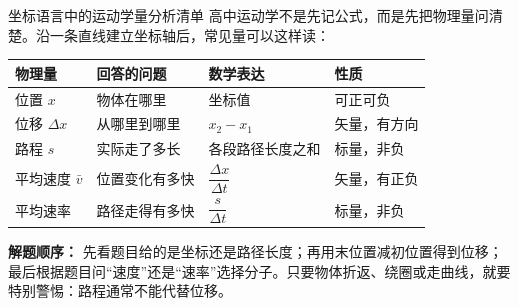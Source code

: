 \begin{learningbox}{坐标语言中的运动学量分析清单}
高中运动学不是先记公式，而是先把物理量问清楚。沿一条直线建立坐标轴后，常见量可以这样读：

\begin{center}
\begin{tabular}{llll}
\toprule
物理量 & 回答的问题 & 数学表达 & 性质 \\
\midrule
位置 $x$ & 物体在哪里 & 坐标值 & 可正可负 \\
位移 $\Delta x$ & 从哪里到哪里 & $x_2-x_1$ & 矢量，有方向 \\
路程 $s$ & 实际走了多长 & 各段路径长度之和 & 标量，非负 \\
平均速度 $\bar v$ & 位置变化有多快 & $\dfrac{\Delta x}{\Delta t}$ & 矢量，有正负 \\
平均速率 & 路径走得有多快 & $\dfrac{s}{\Delta t}$ & 标量，非负 \\
\bottomrule
\end{tabular}
\end{center}

\textbf{解题顺序：} 先看题目给的是坐标还是路径长度；再用末位置减初位置得到位移；最后根据题目问“速度”还是“速率”选择分子。只要物体折返、绕圈或走曲线，就要特别警惕：路程通常不能代替位移。
\end{learningbox}


